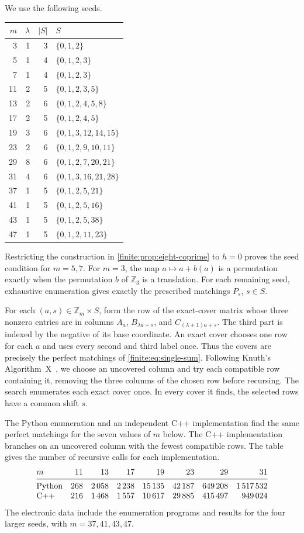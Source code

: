 \documentclass[10pt]{article}
\numberwithin{equation}{section}
\begin{document}
We use the following seeds.
\begin{center}\small
\begin{tabular}{rrrl}
\toprule
$m$&$\lambda$&$|S|$&$S$\\\midrule
3&1&3&$\{0,1,2\}$\\
5&1&4&$\{0,1,2,3\}$\\
7&1&4&$\{0,1,2,3\}$\\
11&2&5&$\{0,1,2,3,5\}$\\
13&2&6&$\{0,1,2,4,5,8\}$\\
17&2&5&$\{0,1,2,4,5\}$\\
19&3&6&$\{0,1,3,12,14,15\}$\\
23&2&6&$\{0,1,2,9,10,11\}$\\
29&8&6&$\{0,1,2,7,20,21\}$\\
31&4&6&$\{0,1,3,16,21,28\}$\\
37&1&5&$\{0,1,2,5,21\}$\\
41&1&5&$\{0,1,2,5,16\}$\\
43&1&5&$\{0,1,2,5,38\}$\\
47&1&5&$\{0,1,2,11,23\}$\\
\bottomrule
\end{tabular}
\end{center}
Restricting the construction in \cref{finite:prop:eight-coprime} to $h=0$ proves the seed condition for $m=5,7$. For $m=3$, the map $a\mapsto a+b(a)$ is a permutation exactly when the permutation $b$ of $\mathbb Z_3$ is a translation. For each remaining seed, exhaustive enumeration gives exactly the prescribed matchings $P_s$, $s\in S$.

For each $(a,s)\in\mathbb Z_m\times S$, form the row of the exact-cover matrix whose three nonzero entries are in columns $A_a$, $B_{\lambda a+s}$, and $C_{(\lambda+1)a+s}$. The third part is indexed by the negative of its base coordinate. An exact cover chooses one row for each $a$ and uses every second and third label once. Thus the covers are precisely the perfect matchings of \cref{finite:eq:single-sum}. Following Knuth's Algorithm~X~\cite{KnuthDancingLinks}, we choose an uncovered column and try each compatible row containing it, removing the three columns of the chosen row before recursing. The search enumerates each exact cover once. In every cover it finds, the selected rows have a common shift $s$.

The Python enumeration and an independent C++ implementation find the same perfect matchings for the seven values of $m$ below. The C++ implementation branches on an uncovered column with the fewest compatible rows. The table gives the number of recursive calls for each implementation.
\[
\begin{array}{@{}l*{7}{r}@{}}
 m & 11 & 13 & 17 & 19 & 23 & 29 & 31\\
 \midrule
 \text{Python} & 268 & 2\,058 & 2\,238 & 15\,135 & 42\,187 & 649\,208 & 1\,517\,532\\
 \text{C++} & 216 & 1\,468 & 1\,557 & 10\,617 & 29\,885 & 415\,497 & 949\,024
\end{array}
\]
The electronic data include the enumeration programs and results for the four larger seeds, with $m=37,41,43,47$.
\end{document}
